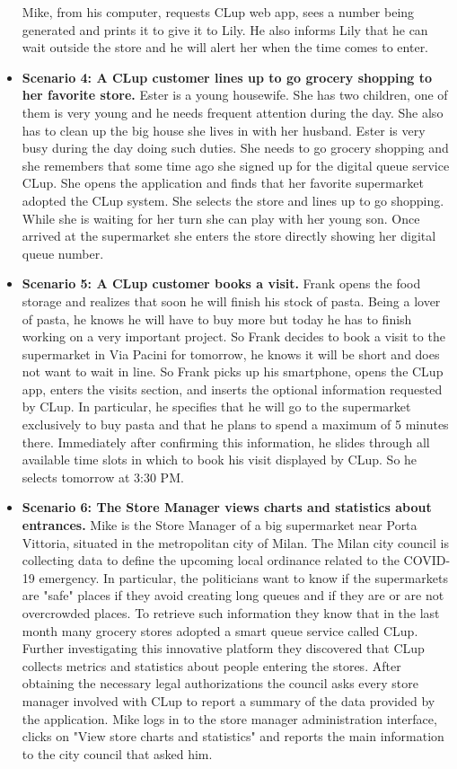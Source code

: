 \begin{itemize}
    Mike, from his computer, requests CLup web app, sees a number being generated and prints it to give it to Lily. He also informs Lily that he can wait outside the store and he will alert her when the time comes to enter.
    \item \textbf{Scenario 4: A CLup customer lines up to go grocery shopping to her favorite store.} Ester is a young housewife. She has two children, one of them is very young and he needs frequent attention during the day. She also has to clean up the big house she lives in with her husband. Ester is very busy during the day doing such duties. She needs to go grocery shopping and she remembers that some time ago she signed up for the digital queue service CLup. She opens the application and finds that her favorite supermarket adopted the CLup system. 
    She selects the store and lines up to go shopping. While she is waiting for her turn she can play with her young son. Once arrived at the supermarket she enters the store directly showing her digital queue number.
    \item \textbf{Scenario 5: A CLup customer books a visit.} Frank opens the food storage and realizes that soon he will finish his stock of pasta. Being a lover of pasta, he knows he will have to buy more but today he has to finish working on a very important project. So Frank decides to book a visit to the supermarket in Via Pacini for tomorrow, he knows it will be short and does not want to wait in line. So Frank picks up his smartphone, opens the CLup app, enters the visits section, and inserts the optional information requested by CLup. In particular, he specifies that he will go to the supermarket exclusively 
    to buy pasta and that he plans to spend a maximum of 5 minutes there. Immediately after confirming this information, he slides through all available time slots in which to book his visit displayed by CLup. So he selects tomorrow at 3:30 PM. 
    \item \textbf{Scenario 6: The Store Manager views charts and statistics about entrances.} Mike is the Store Manager of a big supermarket near Porta Vittoria, situated in the metropolitan city of Milan. The Milan city council is collecting data to define the upcoming local ordinance related to the COVID-19 emergency. In particular, the politicians want to know if the supermarkets are "safe" places if they avoid creating long queues and if they are or are not overcrowded places. 
    To retrieve such information they know that in the last month many grocery stores adopted a smart queue service called CLup. Further investigating this innovative platform they discovered that CLup collects metrics and statistics about people entering the stores. After obtaining the necessary legal authorizations the council asks every store manager involved with CLup to report a summary of the data provided by the application. Mike logs in to the store manager administration interface, clicks on "View store charts and statistics" and reports the main information to the city council that asked him.

\end{itemize}
